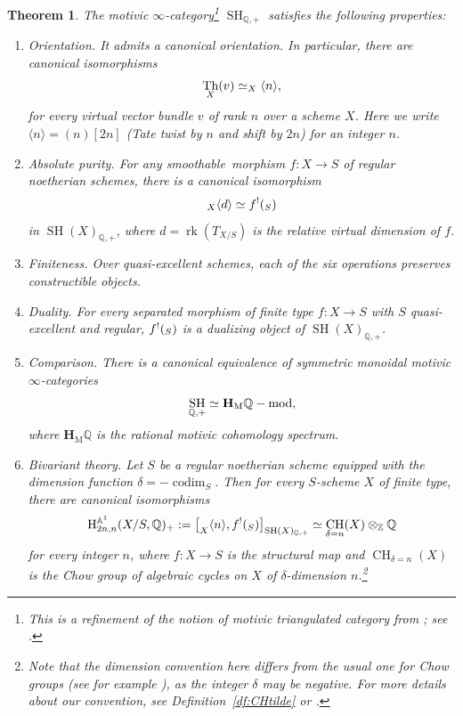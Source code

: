 \documentclass[11pt]{article}
\makeatletter
\numberwithin{equation}{section}\renewcommand{\encodingdefault}{TU}
\DeclareRobustCommand{\mathbbm}[1]{\csname jepbb@#1\endcsname}
\newcommand{\modl}[1]{#1\textnormal{-}\mathrm{mod}}
\DeclareMathOperator{\rk}{rk}
\renewcommand{\AA}{\mathbb A}
\newcommand{\un}{\mathbbm 1}
\newcommand{\HM}{\mathbf H_{\mathrm{M}}}
\newcommand{\BA}{\mathrm H^{\AA^1}}
\DeclareMathOperator{\codim}{codim}
\DeclareMathOperator{\SH}{SH}
\DeclareMathOperator{\CH}{CH}
\newcommand{\twist}[1]{\langle #1 \rangle}
\DeclareMathOperator{\Th}{Th}
\newcommand{\ZZ} {\mathbb Z}
\newcommand{\QQ} {\mathbb Q}
\newtheorem{thmi}{Theorem}
\theoremstyle{remark}
\theoremstyle{definition}
\numberwithin{equation}{thm}
\makeatother
\begin{document}
\begin{thmi}\label{thm:intro_SHQ+}
The motivic $\infty$-category\footnote{This is a refinement of the notion of motivic triangulated category from \cite{CD3}; see \cite{KhanThesis,KhanSix}.} $\SH_{\QQ,+}$ satisfies the following properties:

\begin{enumerate}\renewcommand{\theenumi}{\Roman{enumi}}
\item\emph{Orientation.}\label{item:intro_SHQ+/orientation}
It admits a canonical orientation.
In particular, there are canonical isomorphisms
\[
\Th_X(v) \simeq \un_X\twist{n},
\]
for every virtual vector bundle $v$ of rank $n$ over a scheme $X$.
Here we write $\twist{n} = (n)[2n]$ (Tate twist by $n$ and shift by $2n$) for an integer $n$.
\item\emph{Absolute purity.}
For any smoothable\footnotemark~morphism $f : X \to S$ of regular noetherian schemes, there is a canonical isomorphism
\[ \un_{X}\twist{d} \simeq f^!(\un_{S}) \]
in $\SH(X)_{\QQ,+}$, where $d = \rk(T_{X/S})$ is the relative virtual dimension of $f$.
\item\emph{Finiteness.}
Over quasi-excellent schemes, each of the six operations preserves constructible objects.
\item\emph{Duality.}
For every separated morphism of finite type $f : X \to S$ with $S$ quasi-excellent and regular, $f^!(\un_{S})$ is a dualizing object of $\SH(X)_{\QQ,+}$.
\item\emph{Comparison.}\label{item:intro_SHQ+/comparison}
There is a canonical equivalence of symmetric monoidal motivic $\infty$-categories
\[
\SH_{\QQ,+} \simeq \modl{\HM\QQ},
\]
where $\HM\QQ$ is the rational motivic cohomology spectrum.
\item\emph{Bivariant theory.}
Let $S$ be a regular noetherian scheme equipped with the dimension function $\delta=-\codim_S$.
Then for every $S$-scheme $X$ of finite type, there are canonical isomorphisms\vspace*{-3pt}
\[
\BA_{2n,n}(X/S, \QQ)_+
:= \big[ \un_X\twist{n}, f^!(\un_S) \big]_{\SH(X)_{\QQ,+}}
\simeq \CH_{\delta=n}(X) \otimes_\ZZ \QQ
\]
for every integer $n$, where $f : X \to S$ is the structural map and $\CH_{\delta=n}(X)$ is the Chow group of algebraic cycles on $X$ of $\delta$-dimension $n$.\footnote{Note that the dimension convention here differs from the usual one for Chow groups (see for example \cite{Ful}), as the integer $\delta$ may be negative. For more details about our convention, see Definition~\ref{df:CHtilde} or \cite[Ex.\,3.1.6]{BD1}.}
\end{enumerate}
\end{thmi}
\end{document}
